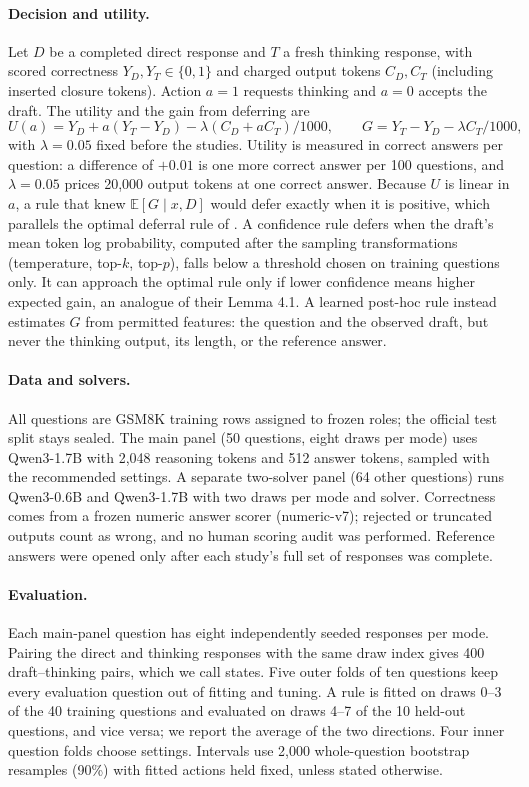 \documentclass[10pt,letterpaper]{article}
\newcommand{\lam}{\lambda}
\begin{document}
\paragraph{Decision and utility.} Let $D$ be a completed direct response and $T$ a fresh thinking response, with scored correctness $Y_D,Y_T\in\{0,1\}$ and charged output tokens $C_D,C_T$ (including inserted closure tokens). Action $a=1$ requests thinking and $a=0$ accepts the draft. The utility and the gain from deferring are
\begin{equation}
U(a)=Y_D+a(Y_T-Y_D)-\lam(C_D+aC_T)/1000,\qquad G=Y_T-Y_D-\lam C_T/1000,
\end{equation}
with $\lam=0.05$ fixed before the studies. Utility is measured in correct answers per question: a difference of $+0.01$ is one more correct answer per 100 questions, and $\lam=0.05$ prices 20,000 output tokens at one correct answer. Because $U$ is linear in $a$, a rule that knew $\mathbb{E}[G\mid x,D]$ would defer exactly when it is positive, which parallels the optimal deferral rule of \citet{jitkrittum2023cascade}. A confidence rule defers when the draft's mean token log probability, computed after the sampling transformations (temperature, top-$k$, top-$p$), falls below a threshold chosen on training questions only. It can approach the optimal rule only if lower confidence means higher expected gain, an analogue of their Lemma 4.1. A learned post-hoc rule instead estimates $G$ from permitted features: the question and the observed draft, but never the thinking output, its length, or the reference answer.

\paragraph{Data and solvers.} All questions are GSM8K training rows assigned to frozen roles; the official test split stays sealed. The main panel (50 questions, eight draws per mode) uses Qwen3-1.7B with 2,048 reasoning tokens and 512 answer tokens, sampled with the recommended settings. A separate two-solver panel (64 other questions) runs Qwen3-0.6B and Qwen3-1.7B with two draws per mode and solver. Correctness comes from a frozen numeric answer scorer (numeric-v7); rejected or truncated outputs count as wrong, and no human scoring audit was performed. Reference answers were opened only after each study's full set of responses was complete.

\paragraph{Evaluation.} Each main-panel question has eight independently seeded responses per mode. Pairing the direct and thinking responses with the same draw index gives 400 draft--thinking pairs, which we call states. Five outer folds of ten questions keep every evaluation question out of fitting and tuning. A rule is fitted on draws 0--3 of the 40 training questions and evaluated on draws 4--7 of the 10 held-out questions, and vice versa; we report the average of the two directions. Four inner question folds choose settings. Intervals use 2,000 whole-question bootstrap resamples (90\%) with fitted actions held fixed, unless stated otherwise.
\end{document}
